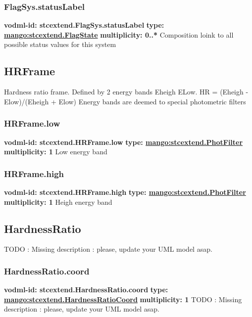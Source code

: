     \subsubsection{FlagSys.statusLabel}
      \textbf{vodml-id: stcextend.FlagSys.statusLabel} \newline
      \textbf{type: \hyperref[sect:stcextend.FlagState]{mango:stcextend.FlagState}} \newline
      \textbf{multiplicity: 0..*} \newline 
      Composition loink to all possible status values for this system

  \subsection{HRFrame}
  \label{sect:stcextend.HRFrame}
    Hardness ratio frame. Defined by 2 energy bands Eheigh ELow. HR = (Eheigh - Elow)/(Eheigh + Elow) Energy bands are deemed to special photometric filters

    \subsubsection{HRFrame.low}
      \textbf{vodml-id: stcextend.HRFrame.low} \newline
      \textbf{type: \hyperref[sect:stcextend.PhotFilter]{mango:stcextend.PhotFilter}} \newline
      \textbf{multiplicity: 1} \newline 
      Low energy band

    \subsubsection{HRFrame.high}
      \textbf{vodml-id: stcextend.HRFrame.high} \newline
      \textbf{type: \hyperref[sect:stcextend.PhotFilter]{mango:stcextend.PhotFilter}} \newline
      \textbf{multiplicity: 1} \newline 
      Heigh energy band

  \subsection{HardnessRatio}
  \label{sect:stcextend.HardnessRatio}
    TODO : Missing description : please, update your UML model asap.

    \subsubsection{HardnessRatio.coord}
      \textbf{vodml-id: stcextend.HardnessRatio.coord} \newline
      \textbf{type: \hyperref[sect:stcextend.HardnessRatioCoord]{mango:stcextend.HardnessRatioCoord}} \newline
      \textbf{multiplicity: 1} \newline 
      TODO : Missing description : please, update your UML model asap.

